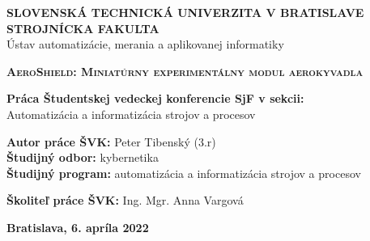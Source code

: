 \renewcommand\thepage{\roman{page}}
\thispagestyle{empty}

\noindent \begin{center}
	\textbf{{\large{}SLOVENSKÁ TECHNICKÁ UNIVERZITA V BRATISLAVE}}\\
	\textbf{{\large{}STROJNÍCKA FAKULTA}}\textbf{\large{} }\\
	{{\large{}Ústav automatizácie, merania a aplikovanej informatiky}}{\large{} }\\
	\vspace{3cm}
	\par\end{center}

\noindent \begin{center}
	\vspace{3cm}
	\par\end{center}



\begin{center}
	\textbf{\textsc{\Large{}AeroShield: Miniatúrny experimentálny modul aerokyvadla}}\\
	\par\end{center}{\Large \par}

\begin{center}
	\textbf{\large{}Práca Študentskej vedeckej konferencie SjF v sekcii:}\\
	{\large{}Automatizácia a informatizácia strojov a procesov}\\
	\par\end{center}{\large \par}

\vspace{6cm}

\begin{center}
	{\large{}\textbf{Autor práce ŠVK:} Peter Tibenský (3.r)}\\
	{\large{}\textbf{Študijný odbor:} kybernetika}\\
	{\large{}\textbf{Študijný program:} automatizácia a informatizácia strojov a procesov}\\
	\par\end{center}{\par}

\vspace{0.6cm}

\begin{center}
	{\large{}\textbf{Školiteľ práce ŠVK:} Ing. Mgr. Anna Vargová}\\
	\par\end{center}{\par}

\vspace{0.6cm}

\begin{center}
	{\large{}\textbf{Bratislava, 6. apríla 2022}}\\
	\par\end{center}{\par}


\cleardoublepage
